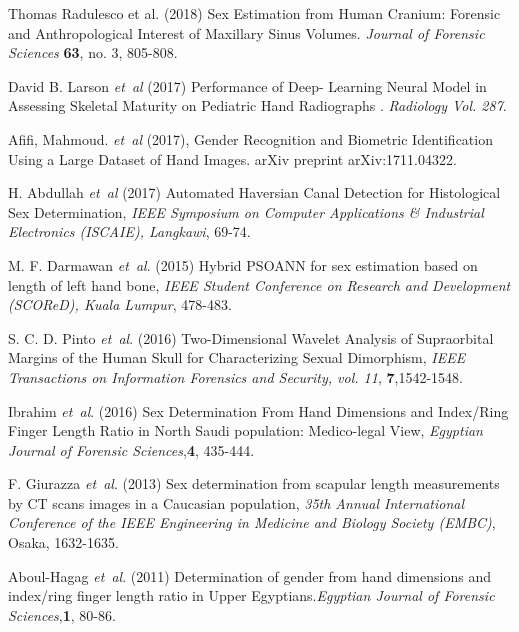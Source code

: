 \documentclass{bioinfo}
\begin{document}
\begin{thebibliography}{}
Thomas Radulesco et al. (2018) Sex Estimation from Human Cranium: Forensic and Anthropological Interest of Maxillary Sinus Volumes. {\it Journal of Forensic Sciences} {\bf 63}, no. 3, 805-808.


David B. Larson {\it et~al} (2017) Performance of Deep- Learning  Neural   Model in Assessing Skeletal Maturity on Pediatric Hand Radiographs . {\it Radiology Vol. 287}.

Afifi, Mahmoud. {\it et~al} (2017), Gender Recognition and Biometric Identification Using a Large Dataset of Hand Images. arXiv preprint arXiv:1711.04322.

H. Abdullah {\it et~al} (2017)  Automated Haversian Canal Detection for Histological Sex Determination, {\it IEEE Symposium on Computer Applications \& Industrial Electronics (ISCAIE), Langkawi}, 69-74.

 M. F. Darmawan {\it et~al}. (2015) Hybrid PSOANN for sex estimation based on length of left hand bone, {\it IEEE Student Conference on Research and Development (SCOReD), Kuala Lumpur}, 478-483.
 
 S. C. D. Pinto {\it et~al}. (2016) Two-Dimensional Wavelet Analysis of Supraorbital Margins of the Human Skull for Characterizing Sexual Dimorphism, {\it IEEE Transactions on Information Forensics and Security, vol. 11}, {\bf 7},1542-1548.
 
Ibrahim {\it et~al}. (2016) Sex Determination From Hand Dimensions and Index/Ring Finger Length Ratio in North Saudi population: Medico-legal View, {\it Egyptian Journal of Forensic Sciences},{\bf 4}, 435-444.

 F. Giurazza {\it et~al}. (2013) Sex determination from scapular length measurements by CT scans images in a Caucasian population, {\it 35th Annual International Conference of the IEEE Engineering in Medicine and Biology Society (EMBC)}, Osaka, 1632-1635.
 
Aboul-Hagag  {\it et~al}. (2011) Determination of gender from hand dimensions and index/ring finger length ratio in Upper Egyptians.{\it Egyptian Journal of Forensic Sciences},{\bf 1}, 80-86.


\end{thebibliography}
\end{document}
